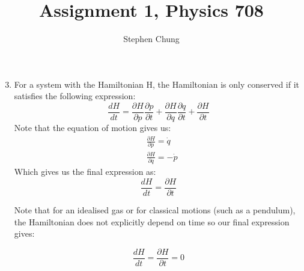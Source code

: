 \documentclass[12pt,a4paper]{article}
\begin{document}
	\title{Assignment 1, Physics 708}
	\author{Stephen Chung}
	\date{}
	\maketitle
	
\begin{enumerate}
	\setcounter{enumi}{2}
	\item For a system with the Hamiltonian H, the Hamiltonian is only conserved if it satisfies the following expression:
	\[\frac{dH}{dt} = \frac{\partial H}{\partial p} \frac{\partial p}{\partial t} + \frac{\partial H}{\partial q}\frac{\partial q}{\partial t} + \frac{\partial H}{\partial t}\]
    Note that the equation of motion gives us:
    \begin{align*}
    &\frac{\partial H}{\partial p} = \dot{q} \\
    &\frac{\partial H}{\partial q} = -\dot{p}
    \end{align*}
    Which gives us the final expression as:
    \[\frac{dH}{dt} = \frac{\partial H}{\partial t}\]
    
    Note that for an idealised gas or for classical motions (such as a pendulum), the Hamiltonian does not explicitly depend on time so our final expression gives:
    
    \[\frac{dH}{dt} = \frac{\partial H}{\partial t}=0\]
    

\end{enumerate}
\end{document}
